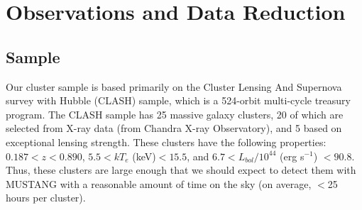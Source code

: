\documentclass[iop,numberedappendix,apj]{emulateapj}
\begin{document}
\section{Observations and Data Reduction}
\label{sec:obs}

\subsection{Sample}

Our cluster sample is based primarily on the Cluster Lensing And Supernova survey with Hubble (CLASH) sample, which is a
524-orbit multi-cycle treasury program. 
The CLASH sample has 25 massive galaxy 
clusters, 20 of which are selected from X-ray data (from Chandra X-ray Observatory), and 5 based on exceptional lensing strength. 
These clusters have the following properties: $0.187 < z < 0.890$, $5.5 < k T_e$ (keV)$ < 15.5$, and $6.7 < L_{bol} / 10^{44} $ 
(erg s$^{-1}$) $<90.8$. Thus, these clusters are large enough that we should expect to detect them with MUSTANG with a reasonable 
amount of time on the sky (on average, $<$25 hours per cluster).

\end{document}
